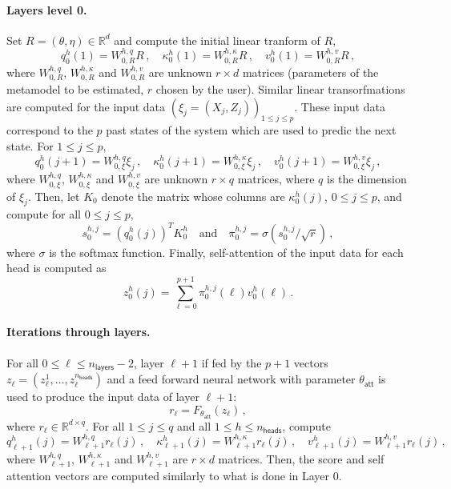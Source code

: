 \documentclass[nolayout]{article}
\newcommand{\eqsp}{\,}
\newcommand{\rset}{\ensuremath{\mathbb{R}}}
\def\nhead{n_{\mathsf{heads}}}
\def\nlayer{n_{\mathsf{layers}}}
\newcommand{\paramattention}{\theta_{\mathsf{att}}}
\begin{document}
\paragraph{Layers level 0.} 
Set $R = (\theta,\eta)\in\rset^d$ and compute the initial linear tranform of $R$, 
$$
q_0^{h}(1) =  W_{0,R}^{h,q} R\eqsp,\quad \kappa_0^{h}(1) =  W_{0,R}^{h,\kappa} R\eqsp,\quad v_0^{h}(1) =  W_{0,R}^{h,v} R \eqsp,
$$
where $W_{0,R}^{h,q}$, $W_{0,R}^{h,\kappa}$ and $W_{0,R}^{h,v}$ are unknown $r\times d$ matrices (parameters of the metamodel to be estimated, $r$ chosen by the user). Similar linear transorfmations are computed for the input data $(\xi_j = (X_j,Z_j))_{1\leqslant j \leqslant p}$. These input data correspond to the $p$ past states of the system which are used to predic the next state. For $1\leqslant j\leqslant p$,
$$
q_0^{h}(j+1) =  W_{0,\xi}^{h,q} \xi_j\eqsp,\quad \kappa_0^{h}(j+1) =  W_{0,\xi}^{h,\kappa} \xi_j\eqsp,\quad v_0^{h}(j+1) =  W_{0,\xi}^{h,v} \xi_j \eqsp,
$$
where $W_{0,\xi}^{h,q}$, $W_{0,\xi}^{h,\kappa}$ and $W_{0,\xi}^{h,v}$ are unknown $r\times q$ matrices, where $q$ is the dimension of $\xi_j$.
Then, let $K_0$ denote the matrix whose columns are $\kappa_0^h(j)$, $0\leqslant j\leqslant p$,  and compute for all $0\leqslant j\leqslant p$,
$$
s_0^{h,j} = (q_0^{h}(j))^TK_{0}^{h} \quad\mbox{and}\quad \pi_0^{h,j}= \sigma(s_0^{h,j}/\sqrt{r})\eqsp,
$$
where $\sigma$ is the softmax function. Finally, self-attention of the input data for each head is computed as
$$
z_0^{h}(j) =  \sum_{\ell=0}^{p+1}\pi_0^{h,j}(\ell)v^h_{0}(\ell)\eqsp.
$$



\paragraph{Iterations through layers.}
For all $0\leqslant \ell\leqslant \nlayer-2$, layer $\ell+1$ if fed by the $p+1$ vectors $z_\ell = (z_{\ell}^1,\ldots, z_{\ell}^{\nhead})$ and a feed forward neural network with parameter $\paramattention$ is used to produce the input data of layer $\ell+1$:
$$
r_\ell= F_{\paramattention}(z_{\ell})\eqsp,
$$
where $r_\ell\in\rset^{d\times q}$.
For all $1\leqslant j\leqslant q$  and all $1\leqslant h\leqslant \nhead$, compute
$$
q_{\ell+1}^{h}(j) =  W_{\ell+1}^{h,q} r_\ell(j) \eqsp,\quad \kappa_{\ell+1}^{h}(j) =   W_{\ell+1}^{h,\kappa} r_\ell(j) \eqsp,\quad v_{\ell+1}^{h}(j) =   W_{\ell+1}^{h,v} r_\ell(j) \eqsp,
$$
where $W_{\ell+1}^{h,q}$, $ W_{\ell+1}^{h,\kappa}$ and $ W_{\ell+1}^{h,v}$ are $r\times d$ matrices.
Then, the score and self attention vectors are computed similarly to what is done in Layer 0.
\end{document}
